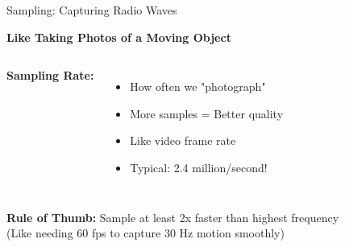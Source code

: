\documentclass[aspectratio=169,11pt]{beamer}
\begin{document}
\begin{frame}{Sampling: Capturing Radio Waves}
\begin{center}
\Large\textbf{Like Taking Photos of a Moving Object}
\end{center}
\vspace{1em}
\begin{columns}

\textbf{Sampling Rate:}
\begin{itemize}
    \item How often we "photograph"
    \item More samples = Better quality
    \item Like video frame rate
    \item Typical: 2.4 million/second!
\end{itemize}
\end{columns}
\vspace{1em}
\begin{center}\colorbox{yellow!20}{\parbox{0.9\textwidth}{
\textbf{Rule of Thumb:} Sample at least 2x faster than highest frequency\\
(Like needing 60 fps to capture 30 Hz motion smoothly)
}}\end{center}
\end{frame}
\end{document}
